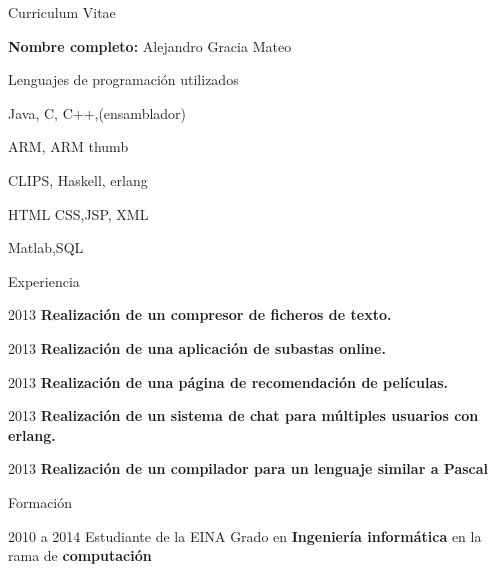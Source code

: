 \begin{cv}{Curriculum Vitae}

\vspace{1cm}
\textbf{Nombre completo:} Alejandro Gracia Mateo
\vspace{1cm}

\begin{cvlist}{Lenguajes de programación utilizados}
\item Java, C, C++,(ensamblador)
\item ARM, ARM thumb
\item CLIPS, Haskell, erlang
\item HTML CSS,JSP, XML
\item Matlab,SQL
\end{cvlist}

\begin{cvlist}{Experiencia}

	\item[2013] \textbf{Realización de un compresor de ficheros de texto.}\\

	\item[2013] \textbf{Realización de una aplicación de subastas online.}\\

	\item[2013] \textbf{Realización de una página de recomendación de películas.}\\
	
	\item[2013] \textbf{Realización de un sistema de chat para múltiples usuarios con erlang.}
	
	\item[2013] \textbf{Realización de un compilador para un lenguaje similar a Pascal}
	

\end{cvlist}

\begin{cvlist}{Formación}

	\item[2010 a 2014] Estudiante de la EINA
		Grado en \textbf{Ingeniería informática} en la rama de \textbf{computación}\\


\end{cvlist}

\end{cv}